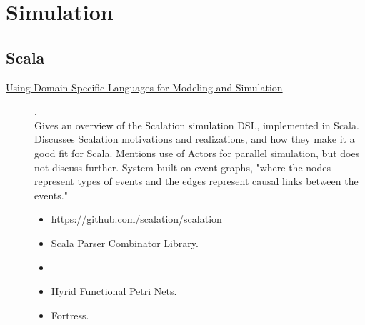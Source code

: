 \chapter {Simulation}

\section{Scala}

\begin{description}
  \item[\href{https://informs-sim.org/wsc10papers/067.pdf}{Using Domain Specific Languages for Modeling and Simulation}] {\cite{miller2010using}.
    \\ Gives an overview of the Scalation simulation DSL, implemented in Scala. Discusses Scalation motivations and realizations, and how they make it a good fit for Scala. Mentions use of Actors for parallel simulation, but does not discuss further. System built on event graphs, "where the nodes represent types of events and the edges represent causal links between the events."
    \begin{itemize}
      \item \href{https://github.com/scalation/scalation}{https://github.com/scalation/scalation}
      \item Scala Parser Combinator Library.
      \item {}
      \item Hyrid Functional Petri Nets.
      \item Fortress.
    \end{itemize}}
\end{description}
